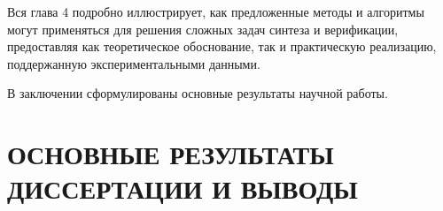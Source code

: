 

Вся глава 4 подробно иллюстрирует, как предложенные методы и алгоритмы могут применяться для решения сложных задач синтеза и верификации, предоставляя как теоретическое обоснование, так и практическую реализацию, поддержанную экспериментальными данными.


В заключении сформулированы основные результаты научной работы.


\section*{ОСНОВНЫЕ РЕЗУЛЬТАТЫ ДИССЕРТАЦИИ И ВЫВОДЫ}

